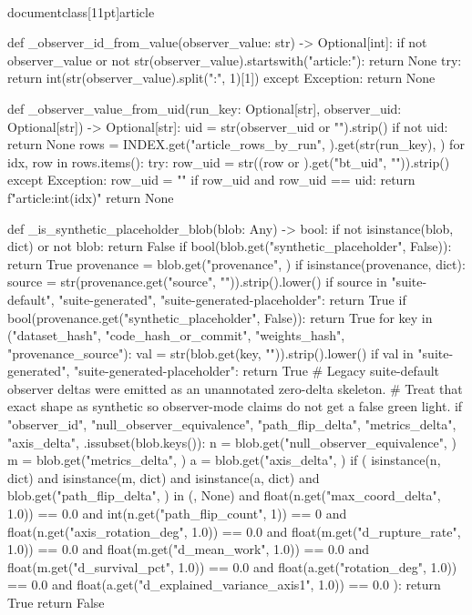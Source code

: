 \\documentclass[11pt]{article}
\begin{document}
\begin{CodeBlock}
def _observer_id_from_value(observer_value: str) -> Optional[int]:
    if not observer_value or not str(observer_value).startswith("article:"):
        return None
    try:
        return int(str(observer_value).split(":", 1)[1])
    except Exception:
        return None


def _observer_value_from_uid(run_key: Optional[str], observer_uid: Optional[str]) -> Optional[str]:
    uid = str(observer_uid or "").strip()
    if not uid:
        return None
    rows = INDEX.get("article_rows_by_run", {}).get(str(run_key), {})
    for idx, row in rows.items():
        try:
            row_uid = str((row or {}).get("bt_uid", "")).strip()
        except Exception:
            row_uid = ""
        if row_uid and row_uid == uid:
            return f"article:{int(idx)}"
    return None


def _is_synthetic_placeholder_blob(blob: Any) -> bool:
    if not isinstance(blob, dict) or not blob:
        return False
    if bool(blob.get("synthetic_placeholder", False)):
        return True
    provenance = blob.get("provenance", {})
    if isinstance(provenance, dict):
        source = str(provenance.get("source", "")).strip().lower()
        if source in {"suite-default", "suite-generated", "suite-generated-placeholder"}:
            return True
        if bool(provenance.get("synthetic_placeholder", False)):
            return True
    for key in ("dataset_hash", "code_hash_or_commit", "weights_hash", "provenance_source"):
        val = str(blob.get(key, "")).strip().lower()
        if val in {"suite-generated", "suite-generated-placeholder"}:
            return True
    # Legacy suite-default observer deltas were emitted as an unannotated zero-delta skeleton.
    # Treat that exact shape as synthetic so observer-mode claims do not get a false green light.
    if {
        "observer_id",
        "null_observer_equivalence",
        "path_flip_delta",
        "metrics_delta",
        "axis_delta",
    }.issubset(blob.keys()):
        n = blob.get("null_observer_equivalence", {})
        m = blob.get("metrics_delta", {})
        a = blob.get("axis_delta", {})
        if (
            isinstance(n, dict)
            and isinstance(m, dict)
            and isinstance(a, dict)
            and blob.get("path_flip_delta", {}) in ({}, None)
            and float(n.get("max_coord_delta", 1.0)) == 0.0
            and int(n.get("path_flip_count", 1)) == 0
            and float(n.get("axis_rotation_deg", 1.0)) == 0.0
            and float(m.get("d_rupture_rate", 1.0)) == 0.0
            and float(m.get("d_mean_work", 1.0)) == 0.0
            and float(m.get("d_survival_pct", 1.0)) == 0.0
            and float(a.get("rotation_deg", 1.0)) == 0.0
            and float(a.get("d_explained_variance_axis1", 1.0)) == 0.0
        ):
            return True
    return False



\end{CodeBlock}
\end{document}
